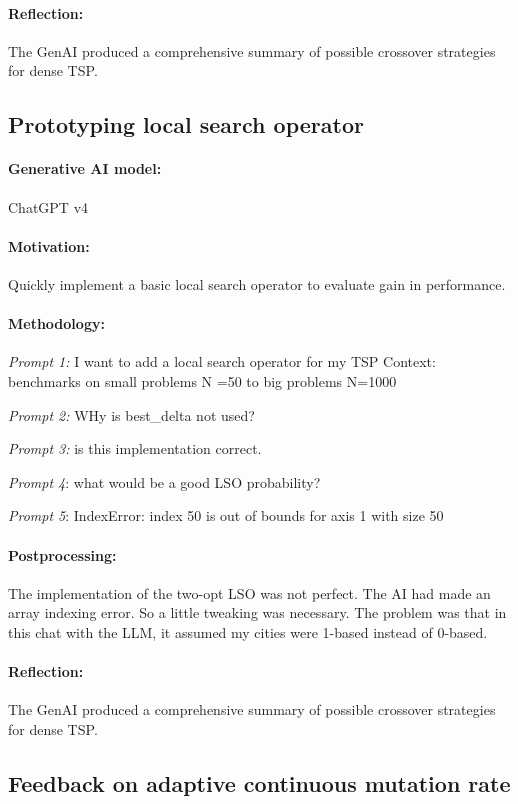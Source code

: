 \documentclass[a4paper,10pt]{article} %
\begin{document}
\paragraph{Reflection:} 
The GenAI produced a comprehensive summary of possible crossover strategies for dense TSP.


\subsection{Prototyping local search operator} 
\paragraph{Generative AI model:} ChatGPT v4
\paragraph{Motivation:}
Quickly implement a basic local search operator to evaluate gain in performance.
\paragraph{Methodology:} 
\textit{Prompt 1:}
I want to add a local search operator for my TSP Context: benchmarks on small problems N =50 to big problems N=1000 

\noindent
\textit{Prompt 2:} WHy is best\_delta not used?

\noindent
\textit{Prompt 3:} is this implementation correct.

\noindent
\textit{Prompt 4}: what would be a good LSO probability?

\noindent
\textit{Prompt 5}: IndexError: index 50 is out of bounds for axis 1 with size 50

\paragraph{Postprocessing:} 
The implementation of the two-opt LSO was not perfect. The AI had made an array indexing error. So a little tweaking was necessary. The problem was that in this chat with the LLM, it assumed my cities were 1-based instead of 0-based.
\paragraph{Reflection:} 
The GenAI produced a comprehensive summary of possible crossover strategies for dense TSP.



\subsection{Feedback on adaptive continuous mutation rate} 
\end{document}

